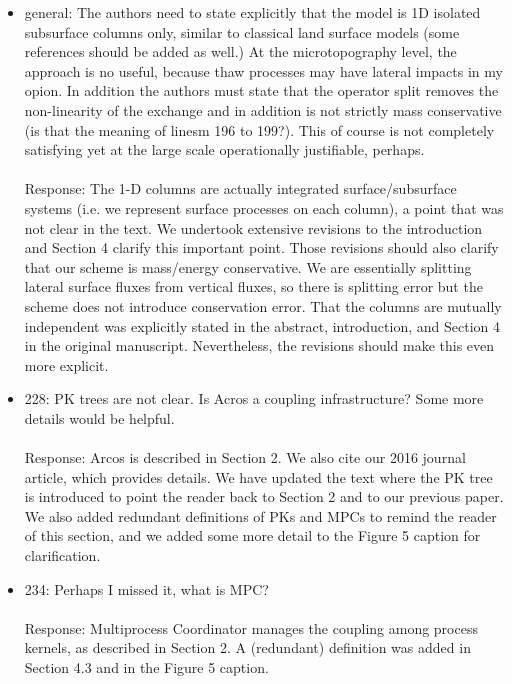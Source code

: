 \documentclass[12pt]{article}\usepackage{amsmath, amssymb, graphicx, array}
\begin{document}
\begin{itemize}

\item general: The authors need to state explicitly that the model is 1D isolated subsurface columns only, similar to classical land surface models (some references should be added as well.) At the microtopography level, the approach is no useful, because thaw processes may have lateral impacts in my opion. In addition the authors must state that the operator split removes the non-linearity of the exchange and in addition is not strictly mass conservative (is that the meaning of linesm 196 to 199?). This of course is not completely satisfying yet at the large scale operationally justifiable, perhaps. \\ \\
Response: The 1-D columns are actually integrated surface/subsurface systems (i.e. we represent surface processes on each column), a point that was not clear in the text. We undertook extensive revisions to the introduction and Section 4 clarify this important point. Those revisions should also clarify that our scheme is mass/energy conservative. We are essentially splitting lateral surface fluxes from vertical fluxes, so there is splitting error but the scheme does not introduce conservation error. That the columns are mutually independent was explicitly stated in the abstract, introduction, and Section 4 in the original manuscript.  Nevertheless, the revisions should make this even more explicit. 

\item 228: PK trees are not clear. Is Acros a coupling infrastructure? Some more details would be helpful. \\ \\
Response: Arcos is described in Section 2. We also cite our 2016 journal article, which provides details. 
We have updated the text where the PK tree is introduced to point the reader back to Section 2 and to our previous paper. We also added redundant definitions of PKs and MPCs to remind the reader of this section, and we added some more detail to the Figure 5 caption for clarification. 

\item 234: Perhaps I missed it, what is MPC? \\ \\ 
Response: Multiprocess Coordinator manages the coupling among process kernels, as described in Section 2. A (redundant) definition was added in Section 4.3 and in the Figure 5 caption. 


\end{itemize}
\end{document}
